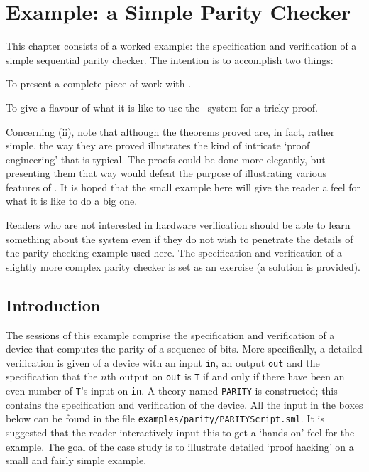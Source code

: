 
\chapter{Example: a Simple Parity Checker}\label{parity}

This chapter consists of a worked example: the specification and
verification of a simple sequential parity checker.  The intention is
to accomplish two things:

\begin{myenumerate}
\item To present a complete piece of work with \HOL.
\item To give a flavour of what it is like to use the \HOL\ system for
  a tricky proof.
\end{myenumerate}

Concerning (ii), note that although the theorems proved are, in fact,
rather simple, the way they are proved illustrates the kind of
intricate `proof engineering' that is typical.  The proofs could be
done more elegantly, but presenting them that way would defeat the
purpose of illustrating various features of \HOL. It is hoped that the
small example here will give the reader a feel for what it is like to
do a big one.

Readers who are not interested in hardware verification should be able
to learn something about the \HOL{} system even if they do not wish to
penetrate the details of the parity-checking example used here.  The
specification and verification of a slightly more complex parity
checker is set as an exercise (a solution is provided).

\section{Introduction}

The sessions of this example comprise the specification and
verification of a device that computes the parity of a sequence of
bits.  More specifically, a detailed verification is given of a device
with an input {\small\verb|in|}, an output {\small\verb|out|} and the
specification that the $n$th output on {\small\verb|out|} is
{\small\verb|T|} if and only if there have been an even number of
{\small\verb|T|}'s input on {\small\verb|in|}. A theory named
{\small\verb|PARITY|} is constructed; this contains the specification
and verification of the device. All the \ML{} input in the boxes below
can be found in the file {\small\verb|examples/parity/PARITYScript.sml|}. It
is suggested that the reader interactively input this to get a `hands
on' feel for the example. The goal of the case study is to illustrate
detailed `proof hacking' on a small and fairly simple example.

